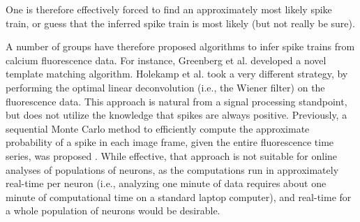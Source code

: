 One is therefore effectively forced to find an approximately most likely spike train, or guess that the inferred spike train is most likely (but not really be sure).  %
%

A number of groups have therefore proposed algorithms to infer spike trains from calcium fluorescence data.  For instance, Greenberg et al. \cite{GreenbergKerr08} developed a novel template matching algorithm. %
Holekamp et al. \cite{HolekampHoly08} took a very different strategy, by performing the optimal linear deconvolution (i.e., the Wiener filter) on the fluorescence data.  This approach is natural from a signal processing standpoint, but does not utilize the knowledge that spikes are always positive.  Previously, a sequential Monte Carlo method to efficiently compute the approximate probability of a spike in each image frame, given the entire fluorescence time series, was proposed \cite{VogelsteinPaninski09}.  While effective, that approach is not suitable for online analyses of populations of neurons, as the computations run in approximately real-time per neuron (i.e., analyzing one minute of data requires about one minute of computational time on a standard laptop computer), and real-time for a whole population of neurons would be desirable.


